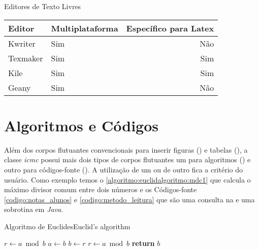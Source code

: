 \begin{quadro}[htb]
\caption{Editores de Texto Livres}
\label{quadro:editores_texto_livres}
\centering
\begin{tabular}{|l|l|r|}        \hline
Editor     & Multiplataforma & Específico para Latex \\ \hline
Kwriter    & Sim             & Não                   \\
Texmaker   & Sim             & Sim                   \\
Kile       & Sim             & Sim                   \\
Geany      & Sim             & Não                   \\ \hline
\end{tabular}
\end{quadro}

\section{Algoritmos e Códigos}
\label{secao:algoritmos_e_codigos}

Além dos corpos flutuantes convencionais para inserir figuras () e tabelas (), a classe \textit{icmc} possui mais dois tipos de corpos flutuantes um para algoritmos () e outro para códigos-fonte (). A utilização de um ou de outro fica a critério do usuário. Como exemplo temos o \autoref{algoritmo:euclidalgoritmo:mdc1} que calcula o máximo divisor comum entre dois números e os Códigos-fonte \ref{codigo:notas_alunos} e \ref{codigo:metodo_leitura} que são uma consulta na  e uma sobrotina em \textit{Java}.


\begin{algoritmo}
\caption{Algoritmo de EuclidesEuclid’s algorithm}\label{euclid}\label{algoritmo:euclidalgoritmo:mdc1}
\begin{algorithmic}[1]
\State $r\gets a\bmod b$
\State $a\gets b$
\State $b\gets r$
\State $r\gets a\bmod b$
\EndWhile\label{euclidendwhile}
\State \Return\textbf{return} $b$
\EndProcedure
\end{algorithmic}
\end{algoritmo}

